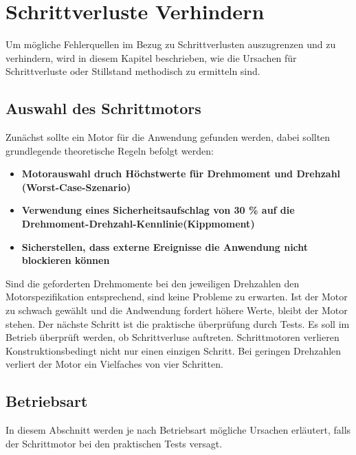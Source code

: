 %

\chapter{Schrittverluste Verhindern}
Um mögliche Fehlerquellen im Bezug zu Schrittverlusten auszugrenzen und zu verhindern, wird in diesem Kapitel beschrieben, wie die Ursachen für Schrittverluste oder Stillstand methodisch zu ermitteln sind. \cite{FaulhaberDriveSystems.2020}

\section{Auswahl des Schrittmotors}
Zunächst sollte ein Motor für die Anwendung gefunden werden, dabei sollten grundlegende theoretische Regeln befolgt werden:
\begin{itemize}
	\item {\textbf{Motorauswahl druch Höchstwerte für Drehmoment und Drehzahl (Worst-Case-Szenario)}}
	\item {\textbf{Verwendung eines Sicherheitsaufschlag von 30 \% auf die Drehmoment-Drehzahl-Kennlinie(Kippmoment)}}
	\item {\textbf{Sicherstellen, dass externe Ereignisse die Anwendung nicht blockieren können}}
\end{itemize}

Sind die geforderten Drehmomente bei den jeweiligen Drehzahlen den Motorspezifikation entsprechend, sind keine Probleme zu erwarten. Ist der Motor zu schwach gewählt und die Andwendung fordert höhere Werte, bleibt der Motor stehen. 
Der nächste Schritt ist die praktische überprüfung durch Tests. Es soll im Betrieb überprüft werden, ob Schrittverluse auftreten. Schrittmotoren verlieren Konstruktionsbedingt nicht nur einen einzigen Schritt. Bei geringen Drehzahlen verliert der Motor ein Vielfaches von vier Schritten.\cite{FaulhaberDriveSystems.2020}


\section{Betriebsart}

In diesem Abschnitt werden je nach Betriebsart mögliche Ursachen erläutert, falls der Schrittmotor bei den praktischen Tests versagt.

